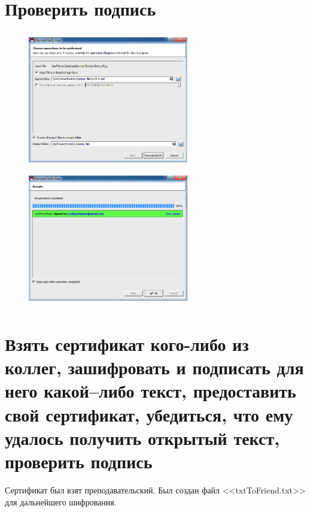 \documentclass[utf8x, 12pt]{G7-32}
\begin{document}
\section{Проверить подпись}
\begin{figure}[hhh!]
	\begin{center}
		\includegraphics[width=7cm, height=6cm]{img/6_1}
		\includegraphics[width=7cm, height=6cm]{img/6_2}
	\end{center}
\end{figure}	


\section{Взять сертификат кого-либо из коллег, зашифровать и подписать для него какой--либо текст, предоставить свой сертификат, убедиться, что ему удалось получить открытый текст, проверить подпись}

Сертификат был взят преподавательский. Был создан файл <<txtToFriend.txt>> для дальнейшего шифрования.
\end{document}
